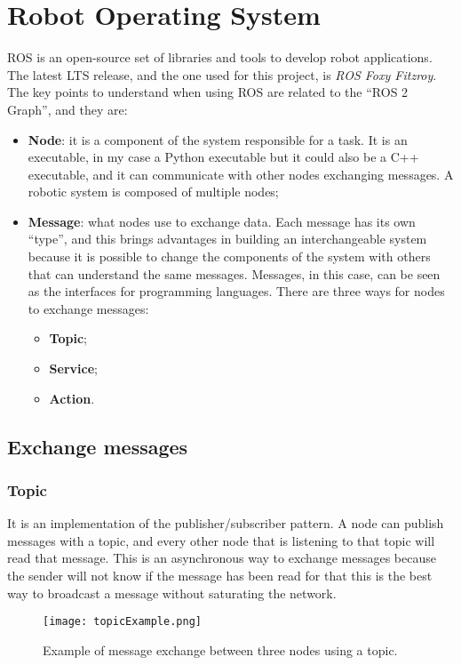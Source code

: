 \documentclass[../thesis.tex]{subfiles}
\begin{document}
\section{Robot Operating System}
\acrfull{ROS} is an open-source set of libraries and tools to develop robot applications. The latest \acrshort{LTS} release, and the one used for this project, is \textit{ROS Foxy Fitzroy}. The key points to understand when using \acrshort{ROS} are related to the ``ROS 2 Graph'', and they are:
\begin{itemize}
    \item \textbf{Node}: it is a component of the system responsible for a task. It is an executable, in my case a Python executable but it could also be a C++ executable, and it can communicate with other nodes exchanging messages. A robotic system is composed of multiple nodes;
    \item \textbf{Message}: what nodes use to exchange data. Each message has its own ``type'', and this brings advantages in building an interchangeable system because it is possible to change the components of the system with others that can understand the same messages. Messages, in this case, can be seen as the interfaces for programming languages. There are three ways for nodes to exchange messages:
        \begin{itemize}
            \item \textbf{Topic};
            \item \textbf{Service};
            \item \textbf{Action}.
        \end{itemize}
\end{itemize}
\subsection{Exchange messages}
\subsubsection{Topic}
It is an implementation of the publisher/subscriber pattern. A node can publish messages with a topic, and every other node that is listening to that topic will read that message. This is an asynchronous way to exchange messages because the sender will not know if the message has been read for that this is the best way to broadcast a message without saturating the network.
\begin{figure}[H]
    \centering
    \texttt{[image: topicExample.png]}
    \caption{Example of message exchange between three nodes using a topic.}
    \label{fig:exampleTopicExchangeMessage}
\end{figure}
\end{document}
